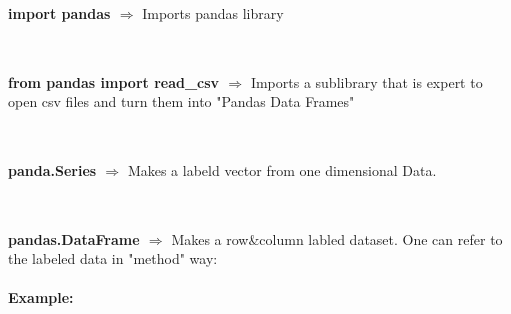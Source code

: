 \documentclass[a4paper,18pt]{article}
\begin{document}
\newpage

\section{\colorbox {Abi}{}}
\subsection{\colorbox {matgreen}{\color{white}{\large import pandas}}}
\textbf{import pandas $\Rightarrow$} Imports pandas library\\\\


\subsection{\colorbox {matgreen}{\color{white}{\large from pandas import read\_csv}}}
\textbf{from pandas import read\_csv $\Rightarrow$} Imports a sublibrary that is expert to open csv files and turn them into "Pandas Data Frames"\\\\


\subsection{\colorbox {matgreen}{\color{white}{\large pandas.Series(data=Data, index=labels)}}}
\textbf{panda.Series $\Rightarrow$} Makes a labeld vector from one dimensional Data.\\\\


\subsection{\colorbox {matgreen}{\color{white}{\large pandas.DataFrame(data=Data, index = rowlabels , columns = column labels)}}}
\textbf{pandas.DataFrame $\Rightarrow$} Makes a row\&column labled dataset. One can refer to the labeled data in "method" way:\\\\
\textbf{Example:\\}
\end{document}
